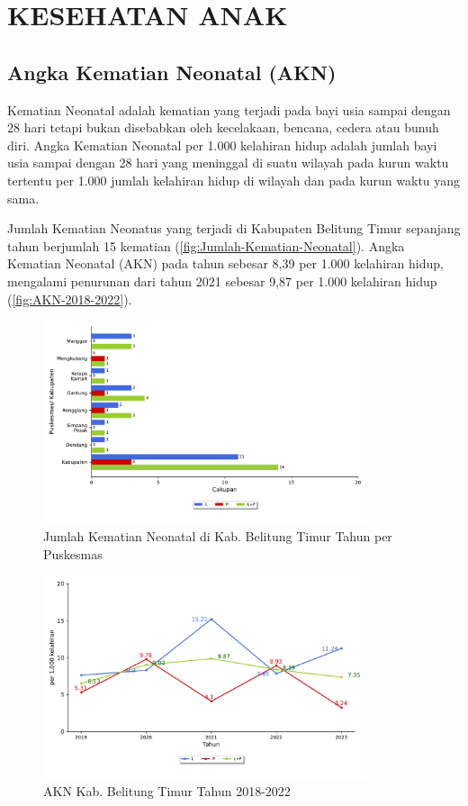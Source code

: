 \section{KESEHATAN ANAK}
\subsection{Angka Kematian Neonatal (AKN)}
Kematian Neonatal adalah kematian yang terjadi pada bayi usia sampai dengan 28 hari tetapi bukan disebabkan oleh kecelakaan, bencana, cedera atau bunuh diri. Angka Kematian Neonatal per 1.000 kelahiran hidup adalah jumlah bayi usia sampai dengan 28 hari yang meninggal di suatu wilayah pada kurun waktu tertentu per 1.000 jumlah kelahiran hidup di wilayah dan pada kurun waktu yang sama.

Jumlah Kematian Neonatus yang terjadi di Kabupaten Belitung Timur sepanjang tahun \tP berjumlah 15 kematian (\autoref{fig:Jumlah-Kematian-Neonatal}). Angka Kematian Neonatal (AKN) pada tahun \tP sebesar 8,39 per 1.000 kelahiran hidup, mengalami penurunan dari tahun 2021 sebesar 9,87 per 1.000 kelahiran hidup (\autoref{fig:AKN-2018-2022}).

\begin{figure}[H]
    \centering{}
    \includegraphics[width=0.85\textwidth]{bab_05/bab_05_09_kematianNeonatal}
    \caption{Jumlah Kematian Neonatal di Kab. Belitung Timur Tahun \tP per Puskesmas}
    \label{fig:Jumlah-Kematian-Neonatal}
\end{figure}

\begin{figure}[H]
    \centering{}
    \includegraphics[width=0.85\textwidth]{bab_05/bab_05_09_plotNeonatal}
    \caption{AKN Kab. Belitung Timur Tahun 2018-2022}
    \label{fig:AKN-2018-2022}
\end{figure}



